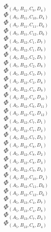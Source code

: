 \documentclass[14pt]{article}
\begin{document}
    $\Phi_{({A}_{5}, {B}_{11}, {C}_{9}, {D}_{4})}$ \\ 
    $\Phi_{({A}_{5}, {B}_{11}, {C}_{10}, {D}_{4})}$ \\ 
    $\Phi_{({A}_{5}, {B}_{11}, {C}_{11}, {D}_{6})}$ \\ 
    $\Phi_{({A}_{5}, {B}_{11}, {C}_{12}, {D}_{6})}$ \\ 
    $\Phi_{({A}_{5}, {B}_{12}, {C}_{1}, {D}_{7})}$ \\ 
    $\Phi_{({A}_{5}, {B}_{12}, {C}_{1}, {D}_{8})}$ \\ 
    $\Phi_{({A}_{5}, {B}_{12}, {C}_{2}, {D}_{7})}$ \\ 
    $\Phi_{({A}_{5}, {B}_{12}, {C}_{2}, {D}_{8})}$ \\ 
    $\Phi_{({A}_{5}, {B}_{12}, {C}_{3}, {D}_{7})}$ \\ 
    $\Phi_{({A}_{5}, {B}_{12}, {C}_{3}, {D}_{8})}$ \\ 
    $\Phi_{({A}_{5}, {B}_{12}, {C}_{4}, {D}_{9})}$ \\ 
    $\Phi_{({A}_{5}, {B}_{12}, {C}_{4}, {D}_{10})}$ \\ 
    $\Phi_{({A}_{5}, {B}_{12}, {C}_{6}, {D}_{11})}$ \\ 
    $\Phi_{({A}_{5}, {B}_{12}, {C}_{6}, {D}_{12})}$ \\ 
    $\Phi_{({A}_{5}, {B}_{12}, {C}_{7}, {D}_{1})}$ \\ 
    $\Phi_{({A}_{5}, {B}_{12}, {C}_{7}, {D}_{2})}$ \\ 
    $\Phi_{({A}_{5}, {B}_{12}, {C}_{7}, {D}_{3})}$ \\ 
    $\Phi_{({A}_{5}, {B}_{12}, {C}_{8}, {D}_{1})}$ \\ 
    $\Phi_{({A}_{5}, {B}_{12}, {C}_{8}, {D}_{2})}$ \\ 
    $\Phi_{({A}_{5}, {B}_{12}, {C}_{8}, {D}_{3})}$ \\ 
    $\Phi_{({A}_{5}, {B}_{12}, {C}_{9}, {D}_{4})}$ \\ 
    $\Phi_{({A}_{5}, {B}_{12}, {C}_{10}, {D}_{4})}$ \\ 
    $\Phi_{({A}_{5}, {B}_{12}, {C}_{11}, {D}_{6})}$ \\ 
    $\Phi_{({A}_{5}, {B}_{12}, {C}_{12}, {D}_{6})}$ \\ 
    $\Phi_{({A}_{5}, {B}_{13}, {C}_{4}, {D}_{7})}$ \\ 
    $\Phi_{({A}_{5}, {B}_{13}, {C}_{4}, {D}_{8})}$ \\ 
    $\Phi_{({A}_{5}, {B}_{13}, {C}_{7}, {D}_{4})}$ \\ 
    $\Phi_{({A}_{5}, {B}_{13}, {C}_{8}, {D}_{4})}$ \\ 
\end{document}
